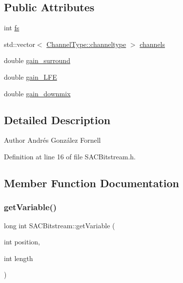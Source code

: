 \subsection*{Public Attributes}
\begin{DoxyCompactItemize}
\item 
int \hyperlink{class_s_a_c_bitstream_a94931a9831b06bba488d4f7b6f1e5744}{fs}
\item 
std\+::vector$<$ \hyperlink{struct_s_a_c_bitstream_1_1_channel_type_a31c32b34085c06a1c58d920ca28c17c9}{Channel\+Type\+::channeltype} $>$ \hyperlink{class_s_a_c_bitstream_a385f676be794f5bb9bec896ef6eda43c}{channels}
\item 
double \hyperlink{class_s_a_c_bitstream_acf9019de0f79c54aae0ffa29a57c3194}{gain\+\_\+surround}
\item 
double \hyperlink{class_s_a_c_bitstream_a4edc51fec93b93461156d8fa376e0116}{gain\+\_\+\+L\+FE}
\item 
double \hyperlink{class_s_a_c_bitstream_a2f4bba870168dd984a7ed4d5214024ed}{gain\+\_\+downmix}
\end{DoxyCompactItemize}


\subsection{Detailed Description}
\begin{DoxyAuthor}{Author}
Andrés González Fornell 
\end{DoxyAuthor}


Definition at line 16 of file S\+A\+C\+Bitstream.\+h.



\subsection{Member Function Documentation}
\mbox{\label{class_s_a_c_bitstream_ad0f39852ca2853efa15be087ce68c3b9}} 
\subsubsection{\texorpdfstring{get\+Variable()}{getVariable()}}
{\footnotesize\ttfamily long int S\+A\+C\+Bitstream\+::get\+Variable (\begin{DoxyParamCaption}\item[{int}]{position,  }\item[{int}]{length }\end{DoxyParamCaption})}


